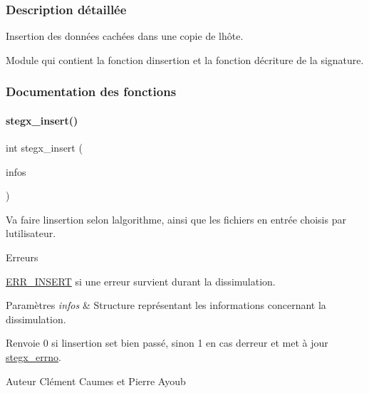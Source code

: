 \subsubsection{Description détaillée}
Insertion des données cachées dans une copie de l\textquotesingle{}hôte. 

Module qui contient la fonction d\textquotesingle{}insertion et la fonction d\textquotesingle{}écriture de la signature. 

\subsubsection{Documentation des fonctions}
\mbox{\label{a00110_a45a1d0709604d55e9d467cb39d6a5b54}} 
\paragraph{\texorpdfstring{stegx\+\_\+insert()}{stegx\_insert()}}
{\footnotesize\ttfamily int stegx\+\_\+insert (\begin{DoxyParamCaption}\item[{\hyperlink{a00008_aa8ca908d92fb5bdd3c0a9e1f58b2cf03}{info\+\_\+s} $\ast$}]{infos }\end{DoxyParamCaption})}



Va faire l\textquotesingle{}insertion selon l\textquotesingle{}algorithme, ainsi que les fichiers en entrée choisis par l\textquotesingle{}utilisateur. 

\begin{DoxyRefDesc}{Erreurs}
\item[\hyperlink{a00134__errors000006}{Erreurs}]\hyperlink{a00011_a08b18ac8af0f3462354240d9732f3852a103888724a059b8ab2855577bd73e8b8}{E\+R\+R\+\_\+\+I\+N\+S\+E\+RT} si une erreur survient durant la dissimulation. \end{DoxyRefDesc}

\begin{DoxyParams}{Paramètres}
{\em infos} & Structure représentant les informations concernant la dissimulation. \\
\hline
\end{DoxyParams}
\begin{DoxyReturn}{Renvoie}
0 si l\textquotesingle{}insertion s\textquotesingle{}et bien passé, sinon 1 en cas d\textquotesingle{}erreur et met à jour \hyperlink{a00062_a5ec48ccdfbe19fe23855818f8556abec}{stegx\+\_\+errno}. 
\end{DoxyReturn}
\begin{DoxyAuthor}{Auteur}
Clément Caumes et Pierre Ayoub 
\end{DoxyAuthor}



